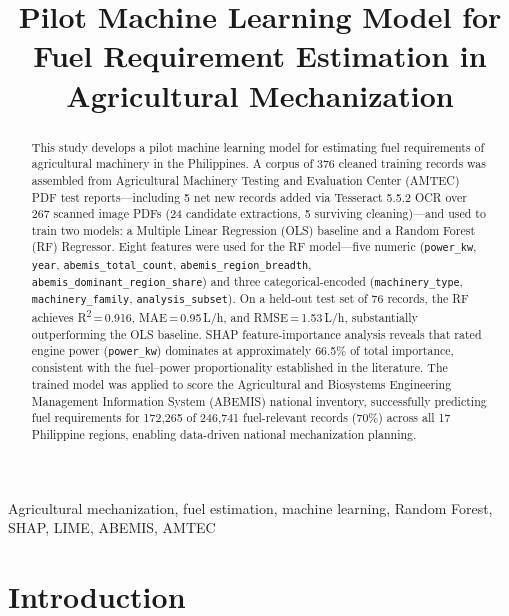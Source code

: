 \documentclass[conference]{IEEEtran}
\title{Pilot Machine Learning Model for Fuel Requirement Estimation in Agricultural Mechanization}
\author{\IEEEauthorblockN{Ronald Melvin R. Rosas}
\IEEEauthorblockA{\textit{University of the Philippines}\\
Diliman, Quezon City, Philippines}
\and
\IEEEauthorblockN{Marcus Rafael Tiongson}
\IEEEauthorblockA{\textit{University of the Philippines}\\
Diliman, Quezon City, Philippines}
}
\begin{document}
\maketitle

\begin{abstract}
This study develops a pilot machine learning model for estimating fuel requirements of agricultural machinery in the Philippines. A corpus of 376 cleaned training records was assembled from Agricultural Machinery Testing and Evaluation Center (AMTEC) PDF test reports---including 5 net new records added via Tesseract 5.5.2 OCR over 267 scanned image PDFs (24 candidate extractions, 5 surviving cleaning)---and used to train two models: a Multiple Linear Regression (OLS) baseline and a Random Forest (RF) Regressor. Eight features were used for the RF model---five numeric (\texttt{power\_kw}, \texttt{year}, \texttt{abemis\_total\_count}, \texttt{abemis\_region\_breadth}, \texttt{abemis\_dominant\_region\_share}) and three categorical-encoded (\texttt{machinery\_type}, \texttt{machinery\_family}, \texttt{analysis\_subset}). On a held-out test set of 76 records, the RF achieves R\textsuperscript{2}\,=\,0.916, MAE\,=\,0.95\,L/h, and RMSE\,=\,1.53\,L/h, substantially outperforming the OLS baseline. SHAP feature-importance analysis reveals that rated engine power (\texttt{power\_kw}) dominates at approximately 66.5\% of total importance, consistent with the fuel--power proportionality established in the literature. The trained model was applied to score the Agricultural and Biosystems Engineering Management Information System (ABEMIS) national inventory, successfully predicting fuel requirements for 172,265 of 246,741 fuel-relevant records (70\%) across all 17 Philippine regions, enabling data-driven national mechanization planning.
\end{abstract}

\begin{IEEEkeywords}
Agricultural mechanization, fuel estimation, machine learning, Random Forest, SHAP, LIME, ABEMIS, AMTEC
\end{IEEEkeywords}

\section{Introduction}
\end{document}
